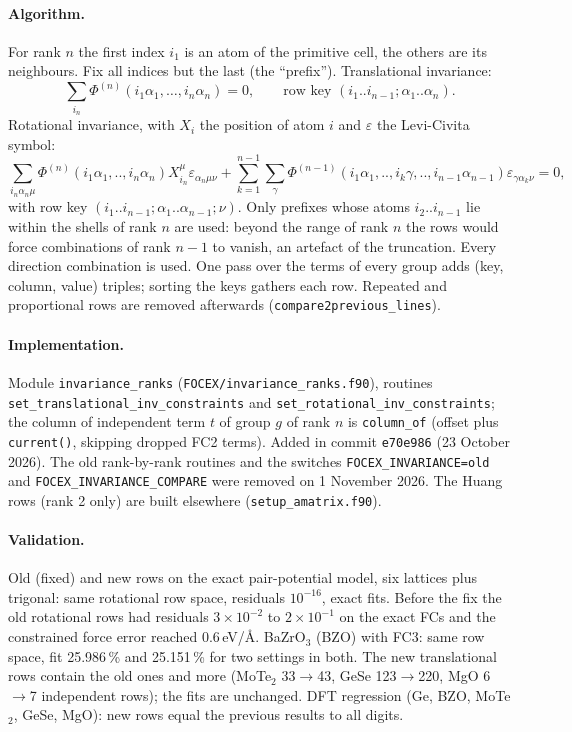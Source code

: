 \documentclass[11pt,a4paper]{article}
\newcommand{\code}[1]{\texttt{#1}}
\begin{document}
\paragraph{Algorithm.} For rank $n$ the first index $i_1$ is an atom of the primitive cell, the others are
its neighbours. Fix all indices but the last (the ``prefix''). Translational invariance:
\begin{equation}
\sum_{i_n}\Phi^{(n)}(i_1\alpha_1,\dots,i_n\alpha_n)=0,\qquad\text{row key }(i_1..i_{n-1};\alpha_1..\alpha_n).
\end{equation}
Rotational invariance, with $X_i$ the position of atom $i$ and $\varepsilon$ the Levi-Civita symbol:
\begin{equation}
\sum_{i_n\alpha_n\mu}\Phi^{(n)}(i_1\alpha_1,..,i_n\alpha_n)X_{i_n}^\mu\varepsilon_{\alpha_n\mu\nu}
+\sum_{k=1}^{n-1}\sum_\gamma\Phi^{(n-1)}(i_1\alpha_1,..,i_k\gamma,..,i_{n-1}\alpha_{n-1})
\varepsilon_{\gamma\alpha_k\nu}=0 ,
\end{equation}
with row key $(i_1..i_{n-1};\alpha_1..\alpha_{n-1};\nu)$. Only prefixes whose atoms $i_2..i_{n-1}$ lie
within the shells of rank $n$ are used: beyond the range of rank $n$ the rows would force combinations of
rank $n-1$ to vanish, an artefact of the truncation. Every direction combination is used. One pass over
the terms of every group adds (key, column, value) triples; sorting the keys gathers each row. Repeated
and proportional rows are removed afterwards (\code{compare2previous\_lines}).

\paragraph{Implementation.} Module \code{invariance\_ranks} (\code{FOCEX/invariance\_ranks.f90}),
routines \code{set\_translational\_inv\_constraints} and \code{set\_rotational\_inv\_constraints}; the
column of independent term $t$ of group $g$ of rank $n$ is \code{column\_of} (offset plus
\code{current()}, skipping dropped FC2 terms). Added in commit \code{e70e986} (23 October 2026). The old
rank-by-rank routines and the switches \code{FOCEX\_INVARIANCE=old} and \code{FOCEX\_INVARIANCE\_COMPARE}
were removed on 1 November 2026. The Huang rows (rank 2 only) are built elsewhere
(\code{setup\_amatrix.f90}).

\paragraph{Validation.} Old (fixed) and new rows on the exact pair-potential model, six lattices plus
trigonal: same rotational row space, residuals $10^{-16}$, exact fits. Before the fix the old rotational
rows had residuals $3\times10^{-2}$ to $2\times10^{-1}$ on the exact FCs and the constrained force error
reached 0.6\,eV/\AA. BaZrO$_3$ (BZO) with FC3: same row space, fit 25.986\,\% and 25.151\,\% for two
settings in both. The new translational rows contain the old ones and more (MoTe$_2$ 33$\to$43, GeSe
123$\to$220, MgO 6$\to$7 independent rows); the fits are unchanged. DFT regression (Ge, BZO, MoTe$_2$,
GeSe, MgO): new rows equal the previous results to all digits.
\end{document}
